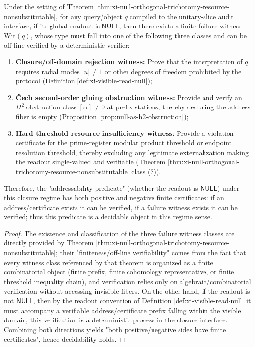 \begin{corollary}\label{cor:xi-unitary-slice-decidable}
Under the setting of Theorem \ref{thm:xi-null-orthogonal-trichotomy-resource-nonsubstitutable}, for any query/object \(q\) compiled to the unitary-slice audit interface, if its global readout is \(\mathsf{NULL}\), then there exists a finite failure witness \(\mathrm{Wit}(q)\), whose type must fall into one of the following three classes and can be off-line verified by a deterministic verifier:
\begin{enumerate}
  \item \textbf{Closure/off-domain rejection witness:} Prove that the interpretation of \(q\) requires radial modes \(|u|\neq 1\) or other degrees of freedom prohibited by the protocol (Definition \ref{def:xi-visible-read-null});
  \item \textbf{Čech second-order gluing obstruction witness:} Provide and verify an \(H^2\) obstruction class \([\alpha]\neq 0\) at prefix stations, thereby deducing the address fiber is empty (Proposition \ref{prop:null-as-h2-obstruction});
  \item \textbf{Hard threshold resource insufficiency witness:} Provide a violation certificate for the prime-register modular product threshold or endpoint resolution threshold, thereby excluding any legitimate externalization making the readout single-valued and verifiable (Theorem \ref{thm:xi-null-orthogonal-trichotomy-resource-nonsubstitutable} class (3)).
\end{enumerate}
Therefore, the "addressability predicate" (whether the readout is \(\mathsf{NULL}\)) under this closure regime has both positive and negative finite certificates: if an address/certificate exists it can be verified, if a failure witness exists it can be verified; thus this predicate is a decidable object in this regime sense.
\end{corollary}
\begin{proof}
The existence and classification of the three failure witness classes are directly provided by Theorem \ref{thm:xi-null-orthogonal-trichotomy-resource-nonsubstitutable}; their "finiteness/off-line verifiability" comes from the fact that every witness class referenced by that theorem is organized as a finite combinatorial object (finite prefix, finite cohomology representative, or finite threshold inequality chain), and verification relies only on algebraic/combinatorial verification without accessing invisible fibers.
On the other hand, if the readout is not \(\mathsf{NULL}\), then by the readout convention of Definition \ref{def:xi-visible-read-null} it must accompany a verifiable address/certificate prefix falling within the visible domain; this verification is a deterministic process in the closure interface.
Combining both directions yields "both positive/negative sides have finite certificates", hence decidability holds.
\end{proof}

\endinput
